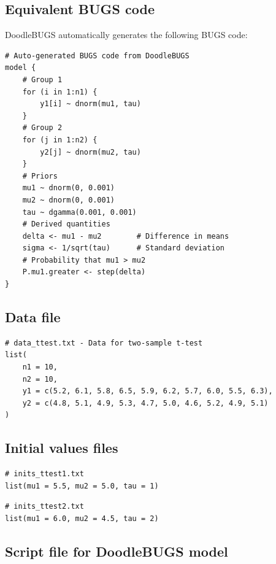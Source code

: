 \subsection{Equivalent BUGS code}

DoodleBUGS automatically generates the following BUGS code:
\begin{codebox}
\begin{verbatim}
# Auto-generated BUGS code from DoodleBUGS
model {
    # Group 1
    for (i in 1:n1) {
        y1[i] ~ dnorm(mu1, tau)
    }
    # Group 2
    for (j in 1:n2) {
        y2[j] ~ dnorm(mu2, tau)
    }
    # Priors
    mu1 ~ dnorm(0, 0.001)
    mu2 ~ dnorm(0, 0.001)
    tau ~ dgamma(0.001, 0.001)
    # Derived quantities
    delta <- mu1 - mu2        # Difference in means
    sigma <- 1/sqrt(tau)      # Standard deviation
    # Probability that mu1 > mu2
    P.mu1.greater <- step(delta)
}
\end{verbatim}
\end{codebox}

\subsection{Data file}

\begin{codebox}
\begin{verbatim}
# data_ttest.txt - Data for two-sample t-test
list(
    n1 = 10,
    n2 = 10,
    y1 = c(5.2, 6.1, 5.8, 6.5, 5.9, 6.2, 5.7, 6.0, 5.5, 6.3),
    y2 = c(4.8, 5.1, 4.9, 5.3, 4.7, 5.0, 4.6, 5.2, 4.9, 5.1)
)
\end{verbatim}
\end{codebox}

\subsection{Initial values files}

\begin{codebox}
\begin{verbatim}
# inits_ttest1.txt
list(mu1 = 5.5, mu2 = 5.0, tau = 1)
\end{verbatim}
\end{codebox}
\begin{codebox}
\begin{verbatim}
# inits_ttest2.txt
list(mu1 = 6.0, mu2 = 4.5, tau = 2)
\end{verbatim}
\end{codebox}

\subsection{Script file for DoodleBUGS model}

